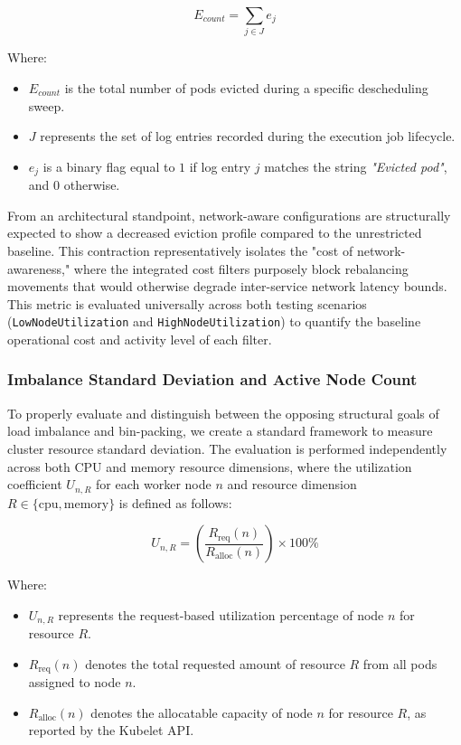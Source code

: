 \[
E_{count} = \sum_{j \in J} e_j
\]

\noindent Where:
\begin{itemize}
    \item \(E_{count}\) is the total number of pods evicted during a specific descheduling sweep.

    \item \(J\) represents the set of log entries recorded during the execution job lifecycle.

    \item \(e_j\) is a binary flag equal to \(1\) if log entry \(j\) matches the string \textit{"Evicted pod"}, and \(0\) otherwise.
\end{itemize}

From an architectural standpoint, network-aware configurations are structurally expected to show a decreased eviction profile compared to the unrestricted baseline. This contraction representatively isolates the "cost of network-awareness," where the integrated cost filters purposely block rebalancing movements that would otherwise degrade inter-service network latency bounds. This metric is evaluated universally across both testing scenarios (\texttt{LowNodeUtilization} and \texttt{HighNodeUtilization}) to quantify the baseline operational cost and activity level of each filter.


\subsubsection{Imbalance Standard Deviation and Active Node Count}
\label{subsubsec:netaware4_evaluationmetrics2}

To properly evaluate and distinguish between the opposing structural goals of load imbalance and bin-packing, we create a standard framework to measure cluster resource standard deviation. The evaluation is performed independently across both CPU and memory resource dimensions, where the utilization coefficient \(U_{n,R}\) for each worker node \(n\) and resource dimension \(R \in \{\text{cpu}, \text{memory}\}\) is defined as follows:

\[
U_{n,R}
=
\left(
\frac{R_{\text{req}}(n)}
{R_{\text{alloc}}(n)}
\right)
\times 100\%
\]

\noindent Where:
\begin{itemize}
    \item \(U_{n,R}\) represents the request-based utilization percentage of node \(n\) for resource \(R\).

    \item \(R_{\text{req}}(n)\) denotes the total requested amount of resource \(R\) from all pods assigned to node \(n\).

    \item \(R_{\text{alloc}}(n)\) denotes the allocatable capacity of node \(n\) for resource \(R\), as reported by the Kubelet API.
\end{itemize}

